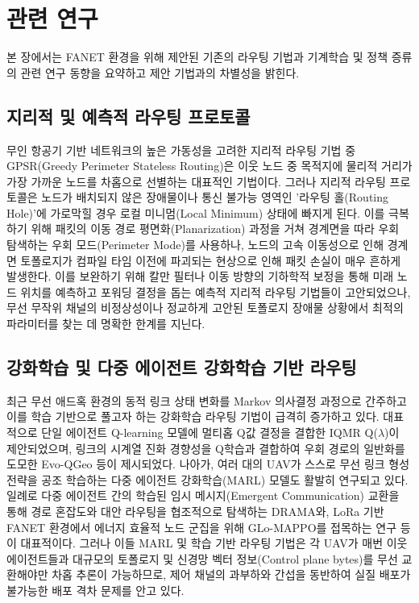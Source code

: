 \section{관련 연구}
\label{sec:관련연구}

본 장에서는 FANET 환경을 위해 제안된 기존의 라우팅 기법과 기계학습 및 정책 증류의 관련 연구 동향을 요약하고 제안 기법과의 차별성을 밝힌다.

\subsection{지리적 및 예측적 라우팅 프로토콜}
무인 항공기 기반 네트워크의 높은 가동성을 고려한 지리적 라우팅 기법 중 GPSR(Greedy Perimeter Stateless Routing)\cite{gpsr}은 이웃 노드 중 목적지에 물리적 거리가 가장 가까운 노드를 차홉으로 선별하는 대표적인 기법이다. 그러나 지리적 라우팅 프로토콜은 노드가 배치되지 않은 장애물이나 통신 불가능 영역인 '라우팅 홀(Routing Hole)'에 가로막힐 경우 로컬 미니멈(Local Minimum) 상태에 빠지게 된다. 이를 극복하기 위해 패킷의 이동 경로 평면화(Planarization) 과정을 거쳐 경계면을 따라 우회 탐색하는 우회 모드(Perimeter Mode)를 사용하나, 노드의 고속 이동성으로 인해 경계면 토폴로지가 컴파일 타임 이전에 파괴되는 현상으로 인해 패킷 손실이 매우 흔하게 발생한다. 이를 보완하기 위해 칼만 필터나 이동 방향의 기하학적 보정을 통해 미래 노드 위치를 예측하고 포워딩 결정을 돕는 예측적 지리적 라우팅 기법들이 고안되었으나, 무선 무작위 채널의 비정상성이나 정교하게 고안된 토폴로지 장애물 상황에서 최적의 파라미터를 찾는 데 명확한 한계를 지닌다.

\subsection{강화학습 및 다중 에이전트 강화학습 기반 라우팅}
최근 무선 애드혹 환경의 동적 링크 상태 변화를 Markov 의사결정 과정으로 간주하고 이를 학습 기반으로 풀고자 하는 강화학습 라우팅 기법이 급격히 증가하고 있다. 대표적으로 단일 에이전트 Q-learning 모델에 멀티홉 Q값 결정을 결합한 IQMR Q($\lambda$)\cite{iqmr}이 제안되었으며, 링크의 시계열 진화 경향성을 Q학습과 결합하여 우회 경로의 일반화를 도모한 Evo-QGeo\cite{evoqgeo} 등이 제시되었다. 
나아가, 여러 대의 UAV가 스스로 무선 링크 형성 전략을 공조 학습하는 다중 에이전트 강화학습(MARL) 모델도 활발히 연구되고 있다. 일례로 다중 에이전트 간의 학습된 임시 메시지(Emergent Communication) 교환을 통해 경로 혼잡도와 대안 라우팅을 협조적으로 탐색하는 DRAMA\cite{drama}와, LoRa 기반 FANET 환경에서 에너지 효율적 노드 군집을 위해 GLo-MAPPO\cite{glo_mappo}를 접목하는 연구 등이 대표적이다. 
그러나 이들 MARL 및 학습 기반 라우팅 기법은 각 UAV가 매번 이웃 에이전트들과 대규모의 토폴로지 및 신경망 벡터 정보(Control plane bytes)를 무선 교환해야만 차홉 추론이 가능하므로, 제어 채널의 과부하와 간섭을 동반하여 실질 배포가 불가능한 배포 격차 문제를 안고 있다.

